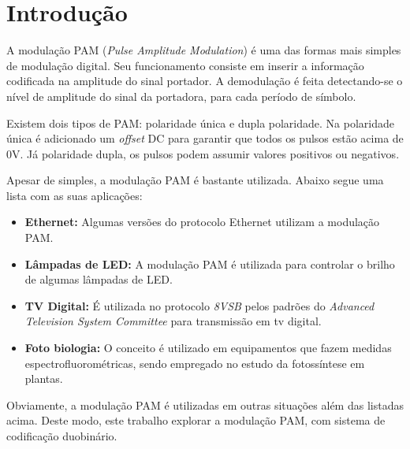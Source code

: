 \newpage
\section{Introdução}
A modulação PAM (\textit{Pulse Amplitude Modulation}) é uma das formas mais 
simples de modulação digital. Seu funcionamento consiste em inserir a 
informação codificada na amplitude do sinal portador. A demodulação é feita 
detectando-se o nível de amplitude do sinal da portadora, para cada período de 
símbolo.

Existem dois tipos de PAM: polaridade única e dupla polaridade. Na polaridade 
única é adicionado um \textit{offset} DC para garantir que todos os pulsos 
estão acima de 0V. Já polaridade dupla, os pulsos podem assumir valores 
positivos ou negativos\cite{Stallings}.
 
Apesar de simples, a modulação PAM é bastante utilizada\cite{Alencar}. Abaixo 
segue uma lista 
com as suas aplicações:

\begin{itemize}
  \item \textbf{Ethernet:} Algumas versões do protocolo Ethernet utilizam a 
  modulação PAM.

  \item \textbf{Lâmpadas de LED:} A modulação PAM é utilizada para controlar o 
  brilho de algumas lâmpadas de LED.
  
  \item \textbf{TV Digital:} É utilizada no protocolo \textit{8VSB} pelos 
  padrões do \textit{Advanced Television System Committee} para transmissão em 
  tv digital.
  
  \item \textbf{Foto biologia:} O conceito é utilizado em equipamentos que 
  fazem medidas espectrofluorométricas, sendo empregado no estudo da 
  fotossíntese em plantas.
\end{itemize}

Obviamente, a modulação PAM é utilizadas em outras situações além das listadas 
acima. Deste modo, este trabalho explorar a modulação PAM, com sistema de 
codificação duobinário.